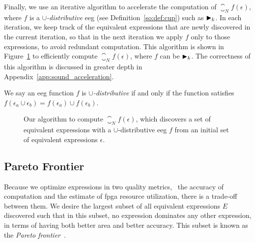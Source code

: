 Finally, we use an iterative algorithm to accelerate the computation of
$\closure_N f (\epsilon)$, where $f$ is a \emph{$\cup$-distributive} \gls{eeg}
(see Definition~\ref{so:def:cup}) such as $\operatorname{\blacktriangleright}_k$.  In each iteration,
we keep track of the equivalent expressions that are newly discovered in the
current iteration, so that in the next iteration we apply $f$ only to those
expressions, to avoid redundant computation.  This algorithm is shown in
Figure~\ref{so:alg:closure} to efficiently compute $\closure_N f(\epsilon)$,
where $f$ can be $\operatorname{\blacktriangleright}_k$.  The correctness of this algorithm is discussed
in greater depth in Appendix~\ref{app:sound_acceleration}.
\begin{definition}
    We say an \gls{eeg} function $f$ is \emph{$\cup$-distributive} if and only
    if the function satisfies $f(\epsilon_a \cup \epsilon_b) = f(\epsilon_a)
    \cup f(\epsilon_b)$.\label{so:def:cup}
\end{definition}
\begin{figure}[ht]
    \centering
    \begin{algorithmic}
        \singlespacing%
                \EndIf{}
            \EndFor{}
        \EndFunction{}
    \end{algorithmic}
    \caption{%
        Our algorithm to compute $\closure_N f (\epsilon)$, which discovers a
        set of equivalent expressions with a $\cup$-distributive \acrshort{eeg}
        $f$ from an initial set of equivalent expressions $\epsilon$.
    }\label{so:alg:closure}
\end{figure}


\subsection{Pareto Frontier}
\label{so:sub:pareto}

Because we optimize expressions in two quality metrics, \ie~the accuracy of
computation and the estimate of \gls{fpga} resource utilization, there is
a trade-off between them. We desire the largest subset of all equivalent
expressions $E$ discovered such that in this subset, no expression dominates
any other expression, in terms of having both better area and better
accuracy. This subset is known as the \emph{Pareto frontier}~\cite{legriel10}.

